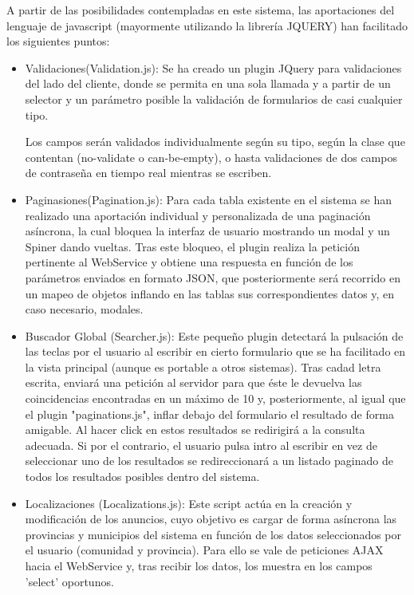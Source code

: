 A partir de las posibilidades contempladas en este sistema, las aportaciones del lenguaje de javascript (mayormente utilizando la librer\'{i}a JQUERY)
han facilitado los siguientes puntos:
\begin{itemize}


\item Validaciones(Validation.js): Se ha creado un plugin JQuery para validaciones del lado del cliente, donde se permita en una sola llamada
y a partir de un selector y un par\'{a}metro posible la validaci\'{o}n de formularios de casi cualquier tipo.

Los campos ser\'{a}n validados individualmente seg\'{u}n su tipo, seg\'{u}n la clase que contentan (no-validate o can-be-empty), 
o hasta validaciones de dos campos de contrase\~{n}a en tiempo real mientras se escriben.

\item Paginasiones(Pagination.js): Para cada tabla existente en el sistema se han realizado una aportaci\'{o}n individual y personalizada
de una paginaci\'{o}n as\'{i}ncrona, la cual bloquea la interfaz de usuario mostrando un modal y un Spiner dando vueltas.
Tras este bloqueo, el plugin realiza la petici\'{o}n pertinente al WebService y obtiene una respuesta en funci\'{o}n
de los par\'{a}metros enviados en formato JSON, que posteriormente ser\'{a} recorrido en un mapeo de objetos inflando
en las tablas sus correspondientes datos y, en caso necesario, modales.

\item Buscador Global (Searcher.js): Este peque\~{n}o plugin detectar\'{a} la pulsaci\'{o}n de las teclas por el usuario 
al escribir en cierto formulario que se ha facilitado en la vista principal (aunque es portable a otros sistemas).
Tras cadad letra escrita, enviar\'{a} una petici\'{o}n al servidor para que \'{e}ste le devuelva las coincidencias encontradas 
en un m\'{a}ximo de 10 y, posteriormente, al igual que el plugin "paginations.js", inflar debajo del formulario el resultado
de forma amigable. Al hacer click en estos resultados se redirigir\'{a} a la consulta adecuada. Si por el contrario, el usuario
pulsa intro al escribir en vez de seleccionar uno de los resultados se redireccionar\'{a} a un listado paginado de todos los resultados
posibles dentro del sistema.


\item Localizaciones (Localizations.js): Este script act\'{u}a en la creaci\'{o}n y modificaci\'{o}n de los anuncios,
cuyo objetivo es cargar de forma as\'{i}ncrona las provincias y municipios del sistema en funci\'{o}n de los datos
seleccionados por el usuario (comunidad y provincia). Para ello se vale de peticiones AJAX hacia el WebService 
y, tras recibir los datos, los muestra en los campos 'select' oportunos.



\end{itemize}
